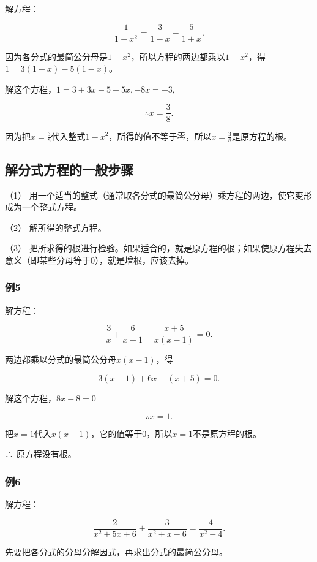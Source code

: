 解方程：

\[
\frac{1}{1 - x ^ {2}} = \frac{3}{1 - x} - \frac{5}{1 + x}.
\]

因为各分式的最简公分母是\(1 - x^2\)，所以方程的两边都乘以\(1 - x^2\)，得\(1 = 3(1 + x) - 5(1 - x)\)。

解这个方程，\(1 = 3 + 3x - 5 + 5x, -8x = -3,\)

\[
\therefore x = \frac{3}{8}.
\]

因为把\(x = \frac{3}{8}\)代入整式\(1 - x^2\)，所得的值不等于零，所以\(x = \frac{3}{8}\)是原方程的根。

\subsection{解分式方程的一般步骤}

（1）
用一个适当的整式（通常取各分式的最简公分母）乘方程的两边，使它变形成为一个整式方程。

（2） 解所得的整式方程。

（3）
把所求得的根进行检验。如果适合的，就是原方程的根；如果使原方程失去意义（即某些分母等于0），就是增根，应该去掉。

\subsubsection{例5}

解方程：

\[
\frac{3}{x} + \frac{6}{x - 1} - \frac{x + 5}{x(x - 1)} = 0.
\]

 两边都乘以分式的最简公分母\(x(x - 1)\)，得

\[
3 (x - 1) + 6 x - (x + 5) = 0.
\]

解这个方程，\(8x - 8 = 0\)

\[
\therefore x = 1.
\]

把\(x = 1\)代入\(x(x - 1)\)，它的值等于0，所以\(x = 1\)不是原方程的根。

∴ 原方程没有根。

\subsubsection{例6}

解方程：

\[
\frac{2}{x ^ {2} + 5 x + 6} + \frac{3}{x ^ {2} + x - 6} = \frac{4}{x ^ {2} - 4}.
\]

 先要把各分式的分母分解因式，再求出分式的最简公分母。


